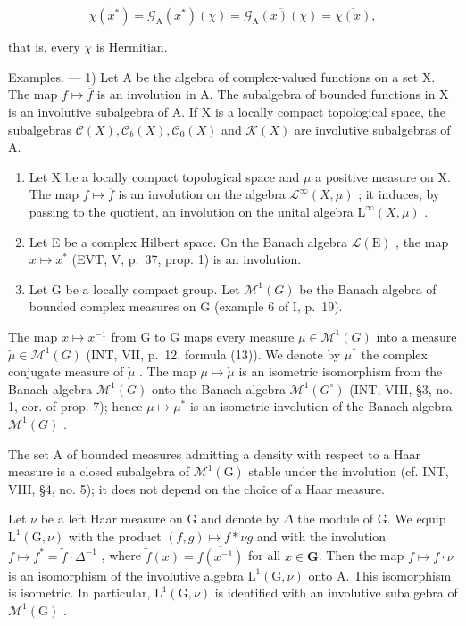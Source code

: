 \[
\chi (x ^ {*}) = \mathcal {G} _ {\mathrm{A}} (x ^ {*}) (\chi) = \overline {{\mathcal {G} _ {\mathrm{A}} (x) (\chi)}} = \overline {{\chi (x)}},
\]

that is, every \(\chi\) is Hermitian.

Examples. --- 1) Let A be the algebra of complex-valued functions on a set X. The map \(f \mapsto \overline{f}\) is an involution in A. The subalgebra of bounded functions in X is an involutive subalgebra of A. If X is a locally compact topological space, the subalgebras \(\mathcal{C}(X), \mathcal{C}_b(X), \mathcal{C}_0(X)\) and \(\mathcal{K}(X)\) are involutive subalgebras of A.

\begin{enumerate}
\def\labelenumi{\arabic{enumi})}
\setcounter{enumi}{1}
\item
  Let X be a locally compact topological space and \(\mu\) a positive measure on X. The map \(f \mapsto \overline{f}\) is an involution on the algebra \(\mathcal{L}^{\infty}(X, \mu)\) ; it induces, by passing to the quotient, an involution on the unital algebra \(\mathrm{L}^{\infty}(X, \mu)\) .
\item
  Let E be a complex Hilbert space. On the Banach algebra \(\mathcal{L}(\mathrm{E})\) , the map \(x \mapsto x^{*}\) (EVT, V, p.~37, prop. 1) is an involution.
\item
  Let G be a locally compact group. Let \(\mathcal{M}^{1}(G)\) be the Banach algebra of bounded complex measures on G (example 6 of I, p.~19).
\end{enumerate}

The map \(x \mapsto x^{-1}\) from G to G maps every measure \(\mu \in \mathcal{M}^{1}(G)\) into a measure \(\check{\mu} \in \mathcal{M}^{1}(G)\) (INT, VII, p.~12, formula (13)). We denote by \(\mu^{*}\) the complex conjugate measure of \(\check{\mu}\) . The map \(\mu \mapsto \check{\mu}\) is an isometric isomorphism from the Banach algebra \(\mathcal{M}^{1}(G)\) onto the Banach algebra \(\mathcal{M}^{1}(G^{\circ})\) (INT, VIII, §3, no. 1, cor. of prop. 7); hence \(\mu \mapsto \mu^{*}\) is an isometric involution of the Banach algebra \(\mathcal{M}^{1}(G)\) .

The set A of bounded measures admitting a density with respect to a Haar measure is a closed subalgebra of \(\mathcal{M}^{1}(\mathrm{G})\) stable under the involution (cf. INT, VIII, §4, no. 5); it does not depend on the choice of a Haar measure.

Let \(\nu\) be a left Haar measure on G and denote by \(\Delta\) the module of G. We equip \(\mathrm{L}^1 (\mathrm{G},\nu)\) with the product \((f,g)\mapsto f*\nu g\) and with the involution \(f\mapsto f^{*} = \widetilde{f}\cdot \Delta^{-1}\) , where \(\widetilde{f} (x) = \overline{f(x^{-1})}\) for all \(x\in \mathbf{G}\). Then the map \(f\mapsto f\cdot \nu\) is an isomorphism of the involutive algebra \(\mathrm{L}^1 (\mathrm{G},\nu)\) onto A. This isomorphism is isometric. In particular, \(\mathrm{L}^1 (\mathrm{G},\nu)\) is identified with an involutive subalgebra of \(\mathcal{M}^1 (\mathrm{G})\) .

